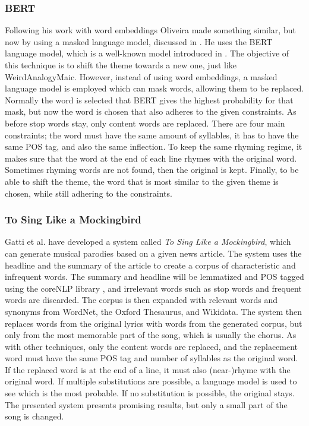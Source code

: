 \subsubsection{BERT}
Following his work with word embeddings Oliveira made something similar, but now by using a masked language model, discussed in \cite{oliveira_exploring_nodate}. He uses the BERT language model, which is a well-known model introduced in \cite{devlin_bert_2019}. The objective of this technique is to shift the theme towards a new one, just like WeirdAnalogyMaic. However, instead of using word embeddings, a masked language model is employed which can mask words, allowing them to be replaced. Normally the word is selected that BERT gives the highest probability for that mask, but now the word is chosen that also adheres to the given constraints. As before stop words stay, only content words are replaced. There are four main constraints; the word must have the same amount of syllables, it has to have the same POS tag, and also the same inflection. To keep the same rhyming regime, it makes sure that the word at the end of each line rhymes with the original word. Sometimes rhyming words are not found, then the original is kept. Finally, to be able to shift the theme, the word that is most similar to the given theme is chosen, while still adhering to the constraints. 

\subsubsection{To Sing Like a Mockingbird}
Gatti et al. have developed a system called \textit{To Sing Like a Mockingbird}, which can generate musical parodies based on a given news article. The system uses the headline and the summary of the article to create a corpus of characteristic and infrequent words. The summary and headline will be lemmatized and POS tagged using the coreNLP library \cite{manning-et-al-2014-corenlp}, and irrelevant words such as stop words and frequent words are discarded. The corpus is then expanded with relevant words and synonyms from WordNet, the Oxford Thesaurus, and Wikidata. The system then replaces words from the original lyrics with words from the generated corpus, but only from the most memorable part of the song, which is usually the chorus. As with other techniques, only the content words are replaced, and the replacement word must have the same POS tag and number of syllables as the original word. If the replaced word is at the end of a line, it must also (near-)rhyme with the original word. If multiple substitutions are possible, a language model is used to see which is the most probable. If no substitution is possible, the original stays. The presented system presents promising results, but only a small part of the song is changed.

